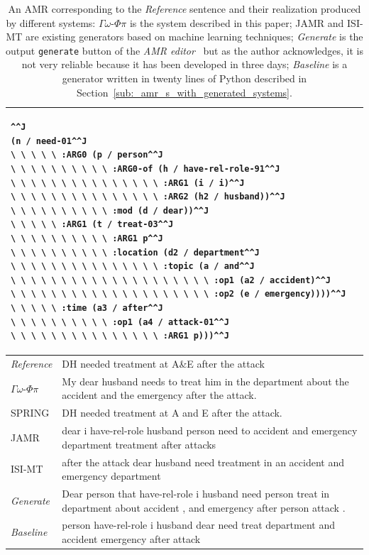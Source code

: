 \documentclass[12pt]{article}
\newcommand{\systeme}[1]{\textsc{#1}}
\newcommand{\gophipy}{$\Gamma\omega$-$\Phi\pi$}
\newcommand{\jamr}{\systeme{JAMR}}
\newcommand{\isimt}{\systeme{ISI-MT}}
\newcommand{\spring}{\systeme{SPRING}}
\newcommand{\representation}[1]{\textsf{#1}}
\newcommand{\AMR}{\representation{AMR}}
\begin{document}
\begin{table}
\begin{tabular}{|p{1in}|p{5.25in}|}%
\hline
\multicolumn{2}{|p{6in}|}{
\begin{lstlisting}^^J
(n / need-01^^J
\ \ \ \ \ :ARG0 (p / person^^J
\ \ \ \ \ \ \ \ \ \ :ARG0-of (h / have-rel-role-91^^J
\ \ \ \ \ \ \ \ \ \ \ \ \ \ \ :ARG1 (i / i)^^J
\ \ \ \ \ \ \ \ \ \ \ \ \ \ \ :ARG2 (h2 / husband))^^J
\ \ \ \ \ \ \ \ \ \ :mod (d / dear))^^J
\ \ \ \ \ :ARG1 (t / treat-03^^J
\ \ \ \ \ \ \ \ \ \ :ARG1 p^^J
\ \ \ \ \ \ \ \ \ \ :location (d2 / department^^J
\ \ \ \ \ \ \ \ \ \ \ \ \ \ \ :topic (a / and^^J
\ \ \ \ \ \ \ \ \ \ \ \ \ \ \ \ \ \ \ \ :op1 (a2 / accident)^^J
\ \ \ \ \ \ \ \ \ \ \ \ \ \ \ \ \ \ \ \ :op2 (e / emergency))))^^J
\ \ \ \ \ :time (a3 / after^^J
\ \ \ \ \ \ \ \ \ \ :op1 (a4 / attack-01^^J
\ \ \ \ \ \ \ \ \ \ \ \ \ \ \ :ARG1 p)))^^J
\end{lstlisting}
}\\\hline
\emph{Reference}& DH needed treatment at A\&E after the attack\\\hline
\gophipy{}&My dear husband needs to treat him in the department about the accident and the emergency after the attack.\\\hline
\spring{}&DH needed treatment at A and E after the attack.\\\hline
\jamr{}& dear i have-rel-role husband person need to accident and emergency department treatment after attacks\\\hline
\isimt{}& after the attack dear husband need treatment in an accident and emergency department\\\hline
\emph{Generate}&Dear person that have-rel-role i husband need person treat in department about accident , and emergency after person attack .\\\hline
\emph{Baseline}&person have-rel-role i husband dear need treat department and accident emergency after attack\\
\hline
\end{tabular}
\caption{An \AMR{} corresponding to the \emph{Reference} sentence and their realization produced by different systems: \gophipy{} is the system described in this paper; \jamr{} and \isimt{} are existing generators based on machine learning techniques; 
\emph{Generate} is the output \texttt{generate} button of the \emph{\AMR{} editor}~\cite{AMR-Editor} but as the author acknowledges, it is not very reliable because it has been developed in three days; \emph{Baseline} is a generator written in twenty lines of Python described in Section~\ref{sub:_amr_s_with_generated_systems}.}
\label{ex:dh_in_ae}
\end{table}
\end{document}
